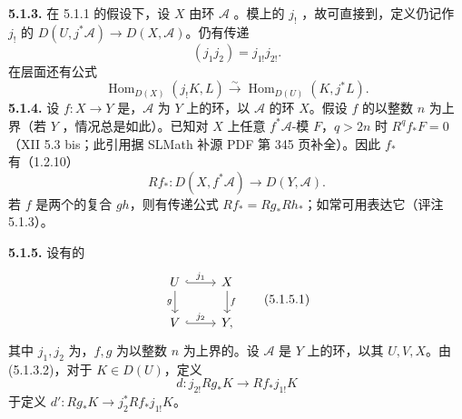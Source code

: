 \textbf{5.1.3.} 在 5.1.1 的假设下，设 $X$ 由环 $\mathscr A$ 。模上的 $j_!$ ，故可直接到，定义仍记作 $j_!$ 的 $D(U,j^*\mathscr A)\to D(X,\mathscr A)$。仍有传递
\[(j_1j_2)=j_{1!}j_{2!}.\tag{5.1.3.1}\]
在层面还有公式
\[\operatorname{Hom}_{D(X)}(j_!K,L)\xrightarrow{\sim}\operatorname{Hom}_{D(U)}(K,j^*L).\tag{5.1.3.2}\]
\textbf{5.1.4.} 设 $f:X\to Y$ 是，$\mathscr A$ 为 $Y$ 上的环，以 $\mathscr A$ 的环 $X$。假设 $f$ 的以整数 $n$ 为上界（若 $Y$ ，情况总是如此）。已知对 $X$ 上任意 $f^*\mathscr A$-模 $F$，$q>2n$ 时 $R^qf_*F=0$（XII 5.3 bis；此引用据 SLMath 补源 PDF 第 345 页补全）。因此 $f_*$ 有（1.2.10）
\[Rf_*:D(X,f^*\mathscr A)\longrightarrow D(Y,\mathscr A).\]
若 $f$ 是两个的复合 $gh$，则有传递公式 $Rf_*=Rg_*Rh_*$；如常可用表达它（评注 5.1.3）。

\textbf{5.1.5.} 设有的
\[\begin{tikzcd}U\arrow[r,hook,"j_1"]\arrow[d,"g"']&X\arrow[d,"f"]\\V\arrow[r,hook,"j_2"]&Y,\end{tikzcd}\tag{5.1.5.1}\]
其中 $j_1,j_2$ 为，$f,g$ 为以整数 $n$ 为上界的。设 $\mathscr A$ 是 $Y$ 上的环，以其 $U,V,X$。由 (5.1.3.2)，对于 $K\in D(U)$，定义
\[d:j_{2!}Rg_*K\longrightarrow Rf_*j_{1!}K\tag{5.1.5.2}\]
于定义 $d':Rg_*K\to j_2^*Rf_*j_{1!}K$。

